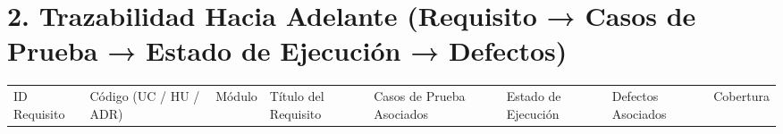\documentclass[10pt,a4paper]{article}
\newcounter{none}
\begin{document}

\section{2. Trazabilidad Hacia Adelante (Requisito → Casos de Prueba → Estado de Ejecución → Defectos)}\label{2-trazabilidad-hacia-adelante-requisito--casos-de-prueba--estado-de-ejecuciuxf3n--defectos}

\begingroup\singlespacing\scriptsize\setlength{\parskip}{0pt}

{\def\LTcaptype{none} %
\begin{longtable}[]{@{}
  >{\raggedright\arraybackslash}p{}
  >{\raggedright\arraybackslash}p{}
  >{\raggedright\arraybackslash}p{}
  >{\raggedright\arraybackslash}p{}
  >{\raggedright\arraybackslash}p{}
  >{\raggedright\arraybackslash}p{}
  >{\raggedright\arraybackslash}p{}
  >{\raggedright\arraybackslash}p{}@{}}
\toprule\noalign{}
\begin{minipage}[b]{\linewidth}\raggedright
ID Requisito
\end{minipage} & \begin{minipage}[b]{\linewidth}\raggedright
Código (UC / HU / ADR)
\end{minipage} & \begin{minipage}[b]{\linewidth}\raggedright
Módulo
\end{minipage} & \begin{minipage}[b]{\linewidth}\raggedright
Título del Requisito
\end{minipage} & \begin{minipage}[b]{\linewidth}\raggedright
Casos de Prueba Asociados
\end{minipage} & \begin{minipage}[b]{\linewidth}\raggedright
Estado de Ejecución
\end{minipage} & \begin{minipage}[b]{\linewidth}\raggedright
Defectos Asociados
\end{minipage} & \begin{minipage}[b]{\linewidth}\raggedright
Cobertura
\end{minipage} \\

\end{longtable}}
\end{document}
